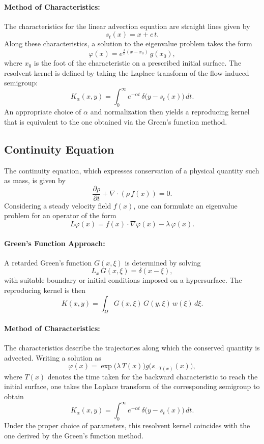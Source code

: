 \documentclass[11pt]{article}
\theoremstyle{plain}
\def\[{\begin{equation}}
\def\]{\end{equation}}
\begin{document}
\paragraph{Method of Characteristics:}  
The characteristics for the linear advection equation are straight lines given by
\[
s_t(x)= x + c\,t.
\]
Along these characteristics, a solution to the eigenvalue problem takes the form
\[
\varphi(x)= e^{\frac{\lambda}{c}(x - x_0)}\,g(x_0),
\]
where \(x_0\) is the foot of the characteristic on a prescribed initial surface. The resolvent kernel is defined by taking the Laplace transform of the flow-induced semigroup:
\[
K_\alpha(x,y)= \int_{0}^{\infty} e^{-\alpha t}\,\delta\bigl(y-s_t(x)\bigr)\,dt.
\]
An appropriate choice of \(\alpha\) and normalization then yields a reproducing kernel that is equivalent to the one obtained via the Green’s function method.

\medskip

\subsection{Continuity Equation}

The continuity equation, which expresses conservation of a physical quantity such as mass, is given by
\[
\frac{\partial \rho}{\partial t} + \nabla \cdot (\rho\, f(x)) = 0.
\]
Considering a steady velocity field \(f(x)\), one can formulate an eigenvalue problem for an operator of the form
\[
L\varphi(x)= f(x)\cdot \nabla \varphi(x) - \lambda\, \varphi(x).
\]

\paragraph{Green's Function Approach:}  
A retarded Green's function \(G(x,\xi)\) is determined by solving
\[
L_x\,G(x,\xi)= \delta(x-\xi),
\]
with suitable boundary or initial conditions imposed on a hypersurface. The reproducing kernel is then
\[
K(x,y)= \int_{\Omega} G(x,\xi)\,G(y,\xi)\,w(\xi)\,d\xi.
\]

\paragraph{Method of Characteristics:}  
The characteristics describe the trajectories along which the conserved quantity is advected. Writing a solution as
\[
\varphi(x)= \exp\!\bigl(\lambda\,T(x)\bigr)g\bigl(s_{-T(x)}(x)\bigr),
\]
where \(T(x)\) denotes the time taken for the backward characteristic to reach the initial surface, one takes the Laplace transform of the corresponding semigroup to obtain
\[
K_\alpha(x,y)= \int_{0}^{\infty} e^{-\alpha t}\, \delta\bigl(y-s_t(x)\bigr)\,dt.
\]
Under the proper choice of parameters, this resolvent kernel coincides with the one derived by the Green’s function method.
\end{document}
